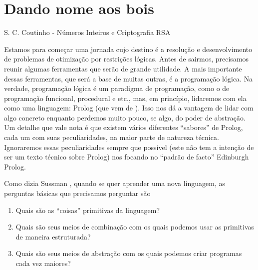 \documentclass{article}
\begin{document}
\section{Dando nome aos bois}

\epigraph{}{S. C. Coutinho - Números Inteiros e Criptografia RSA}


Estamos para começar uma jornada cujo destino é a resolução e desenvolvimento de problemas de otimização por restrições lógicas.
Antes de sairmos, precisamos reunir algumas ferramentas que serão de grande utilidade. A mais importante dessas ferramentas, que
será a base de muitas outras, é a programação lógica. Na verdade, programação lógica é um paradigma de programação, como o de
programação funcional, procedural e etc., mas, em princípio, lidaremos com ela como uma linguagem: Prolog (que vem de ). Isso nos
dá a vantagem de lidar com algo concreto enquanto perdemos muito pouco, se algo, do poder de abstração. Um detalhe que vale nota
é que existem vários diferentes ``sabores'' de Prolog, cada um com suas peculiaridades, na maior parte de natureza técnica.
Ignoraremos essas peculiaridades sempre que possível (este não tem a intenção de ser um texto técnico sobre Prolog) nos focando
no ``padrão de facto'' Edinburgh Prolog.

Como dizia Sussman \cite{sussman}
, quando se quer aprender uma nova linguagem, as perguntas básicas que precisamos perguntar são

\begin{enumerate}
  \item Quais são as ``coisas'' primitivas da linguagem?
  \item Quais são seus meios de combinação com os quais podemos usar as primitivas de maneira estruturada?
  \item Quais são seus meios de abstração com os quais podemos criar programas cada vez maiores?
\end{enumerate}
\end{document}

